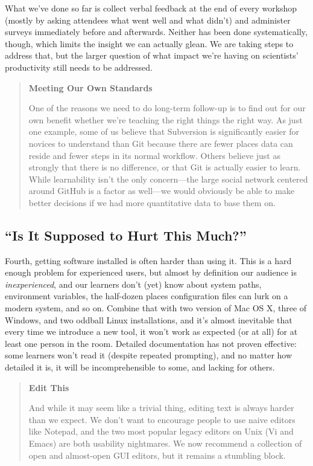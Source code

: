 \documentclass[10pt,a4paper,twocolumn]{article}
\begin{document}
What we've done so far is collect verbal feedback at the end of every
workshop (mostly by asking attendees what went well and what didn't)
and administer surveys immediately before and afterwards. Neither has
been done systematically, though, which limits the insight we can
actually glean. We are taking steps to address that, but the larger
question of what impact we're having on scientists' productivity still
needs to be addressed.

\begin{quote}
\textbf{Meeting Our Own Standards}

One of the reasons we need to do long-term follow-up is to find out for
our own benefit whether we're teaching the right things the right way.
As just one example, some of us believe that Subversion is significantly
easier for novices to understand than Git because there are fewer places
data can reside and fewer steps in its normal workflow. Others believe
just as strongly that there is no difference, or that Git is actually
easier to learn. While learnability isn't the only concern---the large
social network centered around GitHub is a factor as well---we would
obviously be able to make better decisions if we had more quantitative
data to base them on.
\end{quote}

\subsection*{``Is It Supposed to Hurt This Much?''}

Fourth, getting software installed is often harder than using it. This
is a hard enough problem for experienced users, but almost by definition
our audience is \emph{inexperienced}, and our learners don't (yet) know
about system paths, environment variables, the half-dozen places
configuration files can lurk on a modern system, and so on. Combine that
with two version of Mac OS X, three of Windows, and two oddball Linux
installations, and it's almost inevitable that every time we introduce a
new tool, it won't work as expected (or at all) for at least one person
in the room. Detailed documentation has not proven effective: some
learners won't read it (despite repeated prompting), and no matter how
detailed it is, it will be incomprehensible to some, and lacking for
others.

\begin{quote}
\textbf{Edit This}

And while it may seem like a trivial thing, editing text is always
harder than we expect. We don't want to encourage people to use naive
editors like Notepad, and the two most popular legacy editors on Unix
(Vi and Emacs) are both usability nightmares. We now recommend a
collection of open and almost-open GUI editors, but it remains a
stumbling block.
\end{quote}
\end{document}
